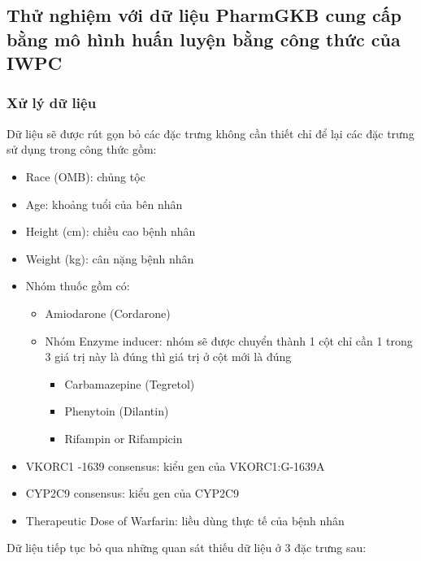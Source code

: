 \documentclass[14pt,oneside]{scrbook}
\providecommand{\tightlist}{\setlength{\itemsep}{\smallskipamount}\setlength{\parskip}{\smallskipamount}}
\begin{document}
\subsection{Thử nghiệm với dữ liệu PharmGKB cung cấp bằng mô hình huấn
luyện bằng công thức của
IWPC}\label{thux1eed-nghiux1ec7m-vux1edbi-dux1eef-liux1ec7u-pharmgkb-cung-cux1ea5p-bux1eb1ng-muxf4-huxecnh-huux1ea5n-luyux1ec7n-bux1eb1ng-cuxf4ng-thux1ee9c-cux1ee7a-iwpc}

\subsubsection{Xử lý dữ liệu}\label{xux1eed-luxfd-dux1eef-liux1ec7u}

Dữ liệu sẽ được rút gọn bỏ các đặc trưng không cần thiết chỉ để lại các
đặc trưng sử dụng trong công thức gồm:

\begin{itemize}
\tightlist
\item
  Race (OMB): chủng tộc
\item
  Age: khoảng tuổi của bên nhân
\item
  Height (cm): chiều cao bệnh nhân
\item
  Weight (kg): cân nặng bệnh nhân
\item
  Nhóm thuốc gồm có:

  \begin{itemize}
  \tightlist
  \item
    Amiodarone (Cordarone)
  \item
    Nhóm Enzyme inducer: nhóm sẽ được chuyển thành 1 cột chỉ cần 1 trong
    3 giá trị này là đúng thì giá trị ở cột mới là đúng

    \begin{itemize}
    \tightlist
    \item
      Carbamazepine (Tegretol)
    \item
      Phenytoin (Dilantin)
    \item
      Rifampin or Rifampicin
    \end{itemize}
  \end{itemize}
\item
  VKORC1 -1639 consensus: kiểu gen của VKORC1:G-1639A
\item
  CYP2C9 consensus: kiểu gen của CYP2C9
\item
  Therapeutic Dose of Warfarin: liều dùng thực tế của bệnh nhân
\end{itemize}

Dữ liệu tiếp tục bỏ qua những quan sát thiếu dữ liệu ở 3 đặc trưng sau:
\end{document}
